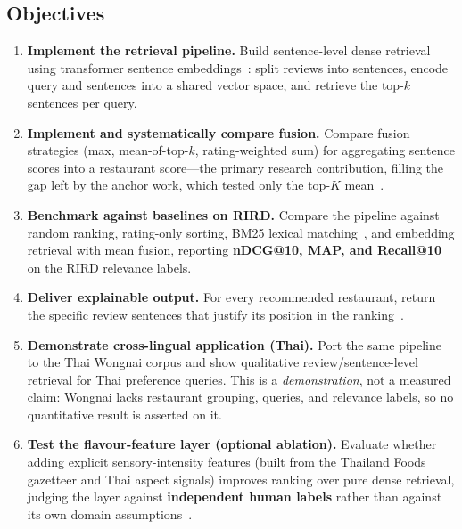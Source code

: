 \documentclass[10pt,twocolumn]{article}
\begin{document}
\subsection{Objectives}
\begin{enumerate}
  \item \textbf{Implement the retrieval pipeline.} Build sentence-level dense retrieval
        using transformer sentence embeddings~\cite{reimers2019sbert,karpukhin2020dpr}:
        split reviews into sentences, encode query and sentences into a shared vector
        space, and retrieve the top-$k$ sentences per query.
  \item \textbf{Implement and systematically compare fusion.} Compare fusion strategies
        (max, mean-of-top-$k$, rating-weighted sum) for aggregating sentence scores into
        a restaurant score---the primary research contribution, filling the gap left by
        the anchor work, which tested only the top-$K$ mean~\cite{rird2023}.
  \item \textbf{Benchmark against baselines on RIRD.} Compare the pipeline against
        random ranking, rating-only sorting, BM25 lexical
        matching~\cite{robertson2009bm25}, and embedding retrieval with mean fusion,
        reporting \textbf{nDCG@10, MAP, and Recall@10} on the RIRD relevance labels.
  \item \textbf{Deliver explainable output.} For every recommended restaurant, return the
        specific review sentences that justify its position in the
        ranking~\cite{zhang2020explainable,kostric2024usage}.
  \item \textbf{Demonstrate cross-lingual application (Thai).} Port the same pipeline to
        the Thai Wongnai corpus and show qualitative review/sentence-level retrieval for
        Thai preference queries. This is a \emph{demonstration}, not a measured claim:
        Wongnai lacks restaurant grouping, queries, and relevance labels, so no
        quantitative result is asserted on it.
  \item \textbf{Test the flavour-feature layer (optional ablation).} Evaluate whether
        adding explicit sensory-intensity features (built from the Thailand Foods
        gazetteer and Thai aspect signals) improves ranking over pure dense retrieval,
        judging the layer against \textbf{independent human labels} rather than against
        its own domain assumptions~\cite{pontiki2014semeval}.
\end{enumerate}
\end{document}
